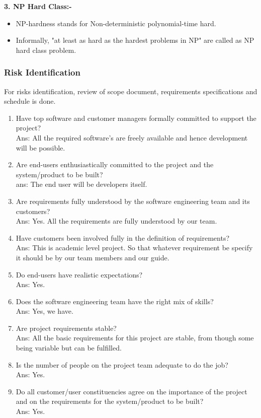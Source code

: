 \begin{flushleft}
	\textbf{3. NP Hard Class:-}
	
	\begin{itemize}
		\item NP-hardness stands for Non-deterministic polynomial-time hard.
		\item Informally, "at least as hard as the hardest problems in NP" are called as NP hard class problem.
	\end{itemize}
\end{flushleft}


\subsubsection{Risk Identification}
For risks identification, review of scope document, requirements specifications and schedule is done. 
\begin{enumerate}
	\item Have top software and customer managers formally committed to support the project?\\
	Ans: All the required software’s are freely available and hence development will be possible.
	\item Are end-users enthusiastically committed to the project and the system/product to be built?\\
	ans: The end user will be developers itself.
	\item Are requirements fully understood by the software engineering team and its customers?\\
	Ans: Yes. All the requirements are fully understood by our team.
	\item Have customers been involved fully in the definition of requirements?\\
	Ans: This is academic level project. So that whatever requirement be specify it should be by our team members and our guide.
	\item Do end-users have realistic expectations?\\
	Ans: Yes.
	\item Does the software engineering team have the right mix of skills?\\
	Ans: Yes, we have.
	\item Are project requirements stable?\\
	Ans: All the basic requirements for this project are stable, from though some being variable but can be fulfilled.
	\item Is the number of people on the project team adequate to do the job?\\
	Ans: Yes.
	\item Do all customer/user constituencies agree on the importance of the project and on the requirements for the system/product to be built?\\
	Ans: Yes.
\end{enumerate}
\newpage
